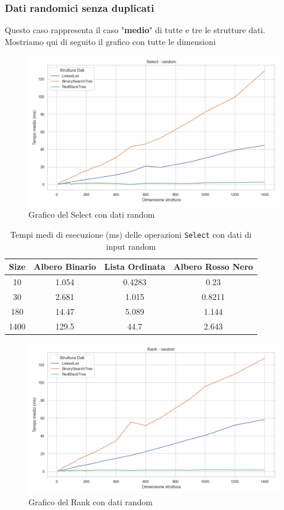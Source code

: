 \documentclass[10pt]{article}
\begin{document}
\subsubsection{Dati randomici senza duplicati}
Questo caso rappresenta il caso "\textbf{medio}" di tutte e tre le strutture dati. Mostriamo qui di seguito il grafico con tutte le dimensioni
\begin{figure}[H]
    \centering
    \includegraphics[width=0.8\linewidth]{plots/confronto/random_select.png}
    \caption{Grafico del Select con dati random}
    \label{confronto-select-random}
\end{figure}
\begin{table}[H]
\centering
\begin{tabular}{|c|c|c|c|}
\hline
\textbf{Size} & \textbf{Albero Binario} & \textbf{Lista Ordinata} & \textbf{Albero Rosso Nero} \\
\hline
10     & 1.054 & 0.4283 & 0.23 \\
30     & 2.681 & 1.015  & 0.8211 \\
180    & 14.47 & 5.089  & 1.144 \\
1400   & 129.5 & 44.7   & 2.643 \\
\hline
\end{tabular}
\caption{Tempi medi di esecuzione (ms) delle operazioni \texttt{Select} con dati di input random}
\label{tab:confronto_select_random}
\end{table}
\begin{figure}[H]
    \centering
    \includegraphics[width=0.8\linewidth]{plots/confronto/random_rank.png}
    \caption{Grafico del Rank con dati random}
    \label{fig:confronto-rank-random}
\end{figure}
\end{document}
